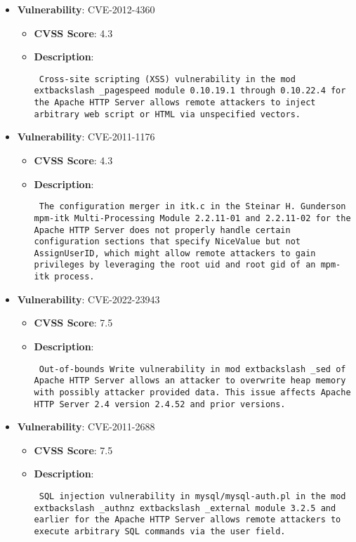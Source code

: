 \documentclass{article}
\begin{document}
\begin{itemize}
        \item \textbf{Vulnerability}: CVE-2012-4360
        \begin{itemize}
            \item \textbf{CVSS Score}:  4.3 
            \item \textbf{Description}: \parbox{\linewidth}{\texttt{ Cross-site scripting (XSS) vulnerability in the mod	extbackslash _pagespeed module 0.10.19.1 through 0.10.22.4 for the Apache HTTP Server allows remote attackers to inject arbitrary web script or HTML via unspecified vectors. }}
        \end{itemize}
    
        \item \textbf{Vulnerability}: CVE-2011-1176
        \begin{itemize}
            \item \textbf{CVSS Score}:  4.3 
            \item \textbf{Description}: \parbox{\linewidth}{\texttt{ The configuration merger in itk.c in the Steinar H. Gunderson mpm-itk Multi-Processing Module 2.2.11-01 and 2.2.11-02 for the Apache HTTP Server does not properly handle certain configuration sections that specify NiceValue but not AssignUserID, which might allow remote attackers to gain privileges by leveraging the root uid and root gid of an mpm-itk process. }}
        \end{itemize}
    
        \item \textbf{Vulnerability}: CVE-2022-23943
        \begin{itemize}
            \item \textbf{CVSS Score}:  7.5 
            \item \textbf{Description}: \parbox{\linewidth}{\texttt{ Out-of-bounds Write vulnerability in mod	extbackslash _sed of Apache HTTP Server allows an attacker to overwrite heap memory with possibly attacker provided data. This issue affects Apache HTTP Server 2.4 version 2.4.52 and prior versions. }}
        \end{itemize}
    
        \item \textbf{Vulnerability}: CVE-2011-2688
        \begin{itemize}
            \item \textbf{CVSS Score}:  7.5 
            \item \textbf{Description}: \parbox{\linewidth}{\texttt{ SQL injection vulnerability in mysql/mysql-auth.pl in the mod	extbackslash _authnz	extbackslash _external module 3.2.5 and earlier for the Apache HTTP Server allows remote attackers to execute arbitrary SQL commands via the user field. }}
        \end{itemize}
    

\end{itemize}
\end{document}
